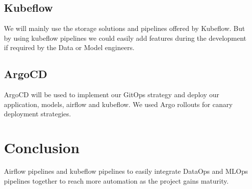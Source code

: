\subsection{Kubeflow}\label{subsec:kubeflow}
We will mainly use the storage solutions and pipelines offered by Kubeflow.
But by using kubeflow pipelines we could easily add features during the development if required by the Data or Model engineers.

\subsection{ArgoCD}\label{subsec:argocd}
ArgoCD will be used to implement our GitOps strategy and deploy our application, models, airflow and kubeflow.
We used Argo rollouts for canary deployment strategies.






\section{Conclusion}\label{sec:conclusion}
Airflow pipelines and kubeflow pipelines to easily integrate DataOps and MLOps pipelines together to reach more automation as the project gains maturity.
